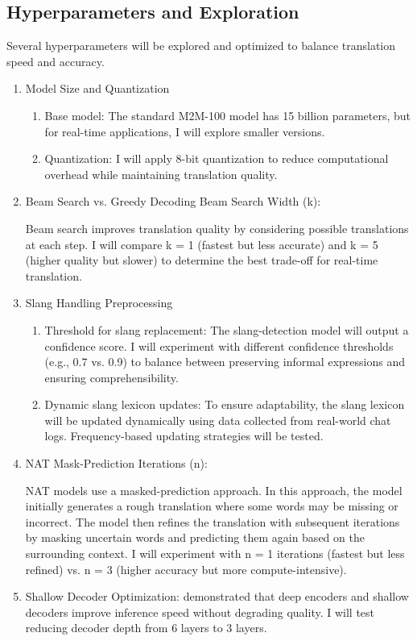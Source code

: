 \documentclass[10pt,twocolumn]{article}
\begin{document}
\subsection{Hyperparameters and Exploration}
Several hyperparameters will be explored and optimized to balance translation speed and accuracy.


\begin{enumerate}
    \item Model Size and Quantization
    \begin{enumerate}
        \item Base model: The standard M2M-100 model has 15 billion parameters, but for real-time applications, I will explore smaller versions.
        \item Quantization: I will apply 8-bit quantization \cite{ZafrirQ8BERT2019} to reduce computational overhead while maintaining translation quality.
    \end{enumerate}
    \item Beam Search vs. Greedy Decoding
Beam Search Width (k): 

Beam search improves translation quality by considering possible translations at each step. I will compare k = 1 (fastest but less accurate) and k = 5 (higher quality but slower) to determine the best trade-off for real-time translation.

    \item Slang Handling Preprocessing
    \begin{enumerate}
        \item Threshold for slang replacement: The slang-detection model will output a confidence score. I will experiment with different confidence thresholds (e.g., 0.7 vs. 0.9) to balance between preserving informal expressions and ensuring comprehensibility.
        \item Dynamic slang lexicon updates: To ensure adaptability, the slang lexicon will be updated dynamically using data collected from real-world chat logs. Frequency-based updating strategies will be tested.
    \end{enumerate}
    \item NAT Mask-Prediction Iterations (n): 

NAT models use a masked-prediction approach. In this approach, the model initially generates a rough translation where some words may be missing or incorrect. The model then refines the translation with subsequent iterations by masking uncertain words and predicting them again based on the surrounding context. I will experiment with n = 1 iterations (fastest but less refined) vs. n = 3 (higher accuracy but more compute-intensive).
\item Shallow Decoder Optimization: 
\textcite{KasaiDeepEncoders2021} demonstrated that deep encoders and shallow decoders improve inference speed without degrading quality. I will test reducing decoder depth from 6 layers to 3 layers.


\end{enumerate}
\end{document}
